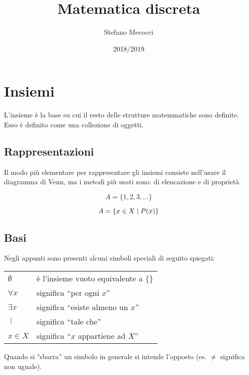 \documentclass[12pt,a4paper]{article}
\title{Matematica discreta}
\author{Stefano Mecocci}
\date{2018/2019}
\newcommand{\Setsuchthat}{\;\ifnum\currentgrouptype=16 \middle\fi|\;} %
\begin{document}
  \maketitle
  \thispagestyle{empty}

  \newpage
  \tableofcontents
  \newpage

  \section{Insiemi}
  L'insieme è la base su cui il resto delle strutture matemmatiche sono definite. Esso è definito come una collezione di oggetti.

  \subsection{Rappresentazioni}
  Il modo più elementare per rappresentare gli insiemi consiste nell'usare il diagramma di Venn, ma i metodi più usati sono: di elencazione e di proprietà.

  \begin{equation}
    A = \{1, 2, 3, \ldots\}
  \end{equation}

  \begin{equation}
    A = \{x \in X \Setsuchthat P(x)\}
  \end{equation}

  \subsection{Basi}
  Negli appunti sono presenti alcuni simboli speciali di seguito spiegati:
  \begin{center}
    \begin{tabular}{p{2cm}p{10cm}}
      $ \emptyset $ & è l'insieme vuoto equivalente a $ \{\} $\\
      $ \forall x $ & significa ``per ogni $x$''\\
      $ \exists x $ & significa ``esiste almeno un $x$''\\
      $ \Setsuchthat $ & significa ``tale che''\\
      $ x \in X $ & significa ``$x$ appartiene ad $X$''\\
    \end{tabular}
  \end{center}
  Quando si "sbarra'' un simbolo in generale si intende l'opposto (es. $ \neq $ significa
  non uguale).
\end{document}
